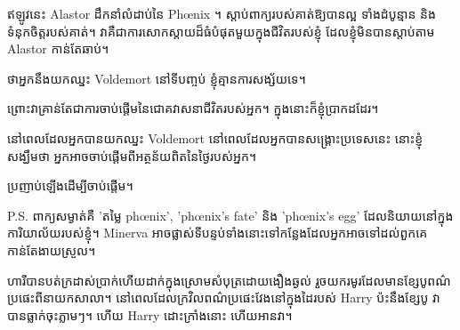 \begin{writtenNote}
ឥឡូវនេះ Alastor ដឹកនាំលំដាប់នៃ Phœnix ។ ស្តាប់ពាក្យរបស់គាត់ឱ្យបានល្អ ទាំងដំបូន្មាន និងទំនុកចិត្តរបស់គាត់។ វា​គឺ​ជា​ការ​សោកស្ដាយ​ដ៏​ធំ​បំផុត​មួយ​ក្នុង​ជីវិត​របស់​ខ្ញុំ ដែល​ខ្ញុំ​មិន​បាន​ស្តាប់​តាម Alastor កាន់​តែ​ឆាប់។

ថាអ្នកនឹងយកឈ្នះ Voldemort នៅទីបញ្ចប់ ខ្ញុំគ្មានការសង្ស័យទេ។

ព្រោះវាគ្រាន់តែជាការចាប់ផ្តើមនៃជោគវាសនាជីវិតរបស់អ្នក។ ក្នុង​នោះ​ក៏​ខ្ញុំ​ប្រាកដ​ដែរ។

នៅពេលដែលអ្នកបានយកឈ្នះ Voldemort នៅពេលដែលអ្នកបានសង្រ្គោះប្រទេសនេះ នោះខ្ញុំសង្ឃឹមថា អ្នកអាចចាប់ផ្តើមពីអត្ថន័យពិតនៃថ្ងៃរបស់អ្នក។

ប្រញាប់ឡើងដើម្បីចាប់ផ្តើម។


P.S. ពាក្យសម្ងាត់គឺ 'តម្លៃ phœnix', 'phœnix's fate' និង 'phœnix's egg' ដែលនិយាយនៅក្នុងការិយាល័យរបស់ខ្ញុំ។ Minerva អាចផ្លាស់ទីបន្ទប់ទាំងនោះទៅកន្លែងដែលអ្នកអាចទៅដល់ពួកគេកាន់តែងាយស្រួល។
\end{writtenNote}

\later

ហារី​បាន​បត់​ក្រដាស់ប្រាក់​ហើយ​ដាក់​ក្នុង​ស្រោម​សំបុត្រ​ដោយ​ងឿង​ឆ្ងល់ រួច​យក​រមូរ​ដែល​មាន​ខ្សែបូ​ពណ៌​ប្រផេះ​ពី​នាយក​សាលា។ នៅពេលដែលក្រវិលពណ៌ប្រផេះវែងនៅក្នុងដៃរបស់ Harry ប៉ះនឹងខ្សែបូ វាបានធ្លាក់ចុះភ្លាមៗ។ ហើយ Harry ដោះក្រាំងនោះ ហើយអានវា។

\later

